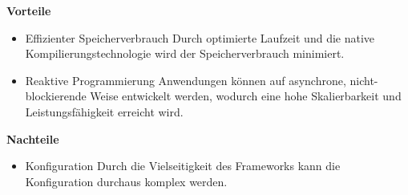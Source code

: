 \textbf{Vorteile}
\begin{itemize}
    \item Effizienter Speicherverbrauch
        \newline
        Durch optimierte Laufzeit und die native Kompilierungstechnologie wird der Speicherverbrauch minimiert.
    \item Reaktive Programmierung
        \newline
        Anwendungen können auf asynchrone, nicht-blockierende Weise entwickelt werden, wodurch eine hohe Skalierbarkeit und Leistungsfähigkeit erreicht wird.
\end{itemize}

\textbf{Nachteile}
\begin{itemize}
    \item Konfiguration
        \newline
        Durch die Vielseitigkeit des Frameworks kann die Konfiguration durchaus komplex werden.
\end{itemize}